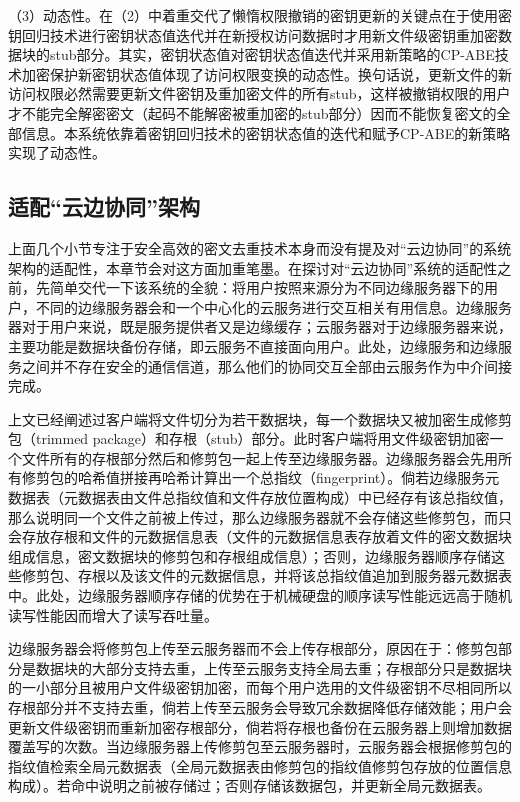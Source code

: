 \documentclass[promaster]{thesis-uestc}
\begin{document}
（3）动态性。在（2）中着重交代了懒惰权限撤销的密钥更新的关键点在于使用密钥回归技术进行密钥状态值迭代并在新授权访问数据时才用新文件级密钥重加密数据块的stub部分。其实，密钥状态值对密钥状态值迭代并采用新策略的CP-ABE技术加密保护新密钥状态值体现了访问权限变换的动态性。换句话说，更新文件的新访问权限必然需要更新文件密钥及重加密文件的所有stub，这样被撤销权限的用户才不能完全解密密文（起码不能解密被重加密的stub部分）因而不能恢复密文的全部信息。本系统依靠着密钥回归技术的密钥状态值的迭代和赋予CP-ABE的新策略实现了动态性。

\subsection{适配“云边协同”架构}\label{适配“云边协同”架构}
上面几个小节专注于安全高效的密文去重技术本身而没有提及对“云边协同”的系统架构的适配性，本章节会对这方面加重笔墨。在探讨对“云边协同”系统的适配性之前，先简单交代一下该系统的全貌：将用户按照来源分为不同边缘服务器下的用户，不同的边缘服务器会和一个中心化的云服务进行交互相关有用信息。边缘服务器对于用户来说，既是服务提供者又是边缘缓存；云服务器对于边缘服务器来说，主要功能是数据块备份存储，即云服务不直接面向用户。此处，边缘服务和边缘服务之间并不存在安全的通信信道，那么他们的协同交互全部由云服务作为中介间接完成。

上文已经阐述过客户端将文件切分为若干数据块，每一个数据块又被加密生成修剪包（trimmed package）和存根（stub）部分。此时客户端将用文件级密钥加密一个文件所有的存根部分然后和修剪包一起上传至边缘服务器。边缘服务器会先用所有修剪包的哈希值拼接再哈希计算出一个总指纹（fingerprint）。倘若边缘服务元数据表（元数据表由文件总指纹值和文件存放位置构成）中已经存有该总指纹值，那么说明同一个文件之前被上传过，那么边缘服务器就不会存储这些修剪包，而只会存放存根和文件的元数据信息表（文件的元数据信息表存放着文件的密文数据块组成信息，密文数据块的修剪包和存根组成信息）；否则，边缘服务器顺序存储这些修剪包、存根以及该文件的元数据信息，并将该总指纹值追加到服务器元数据表中。此处，边缘服务器顺序存储的优势在于机械硬盘的顺序读写性能远远高于随机读写性能因而增大了读写吞吐量。

边缘服务器会将修剪包上传至云服务器而不会上传存根部分，原因在于：修剪包部分是数据块的大部分支持去重，上传至云服务支持全局去重；存根部分只是数据块的一小部分且被用户文件级密钥加密，而每个用户选用的文件级密钥不尽相同所以存根部分并不支持去重，倘若上传至云服务会导致冗余数据降低存储效能；用户会更新文件级密钥而重新加密存根部分，倘若将存根也备份在云服务器上则增加数据覆盖写的次数。当边缘服务器上传修剪包至云服务器时，云服务器会根据修剪包的指纹值检索全局元数据表（全局元数据表由修剪包的指纹值修剪包存放的位置信息构成）。若命中说明之前被存储过；否则存储该数据包，并更新全局元数据表。
\end{document}
